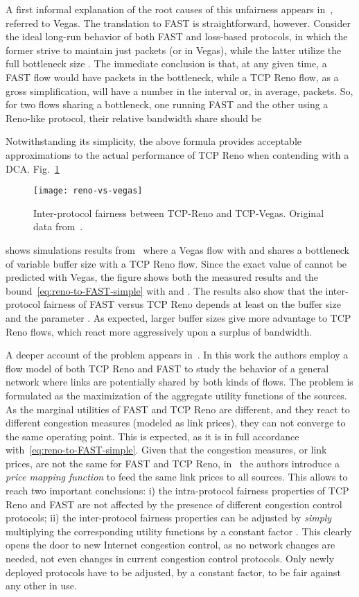 \documentclass[english,times]{ettauth}
\begin{document}
A first informal explanation of the root causes of this unfairness appears
in~\cite{Mo99}, referred to Vegas. The translation to FAST is straightforward,
however. Consider the ideal long-run behavior of both FAST and loss-based
protocols, in which the former strive to maintain just  packets
(or  in Vegas), while the latter utilize the full
bottleneck size . The immediate conclusion is that, at any given time, a
FAST flow would have  packets in the bottleneck, while a TCP Reno flow, as
a gross simplification, will have a number in the interval  or, in
average,  packets. So, for two flows sharing a bottleneck, one
running FAST and the other using a Reno-like protocol, their relative
bandwidth share should be


Notwithstanding its simplicity, the above formula provides acceptable
approximations to the actual performance of TCP Reno when contending with a
DCA. Fig.~\ref{fig:reno-vs-vegas-fairness}
\begin{figure}
  \centering
  \texttt{[image: reno-vs-vegas]}
  \caption{Inter-protocol fairness between TCP-Reno and TCP-Vegas. Original
    data from~\cite{Mo99}.}
  \label{fig:reno-vs-vegas-fairness}
\end{figure}
shows simulations results from~\cite{Mo99} where a Vegas flow with 
and  shares a bottleneck of variable buffer size with a TCP Reno
flow. Since the exact value of  cannot be predicted with Vegas, the figure
shows both the measured results and the bound~\eqref{eq:reno-to-FAST-simple}
with  and . The results also show that the
inter-protocol fairness of FAST versus TCP Reno depends at least on the buffer
size and the parameter . As expected, larger buffer sizes give more
advantage to TCP Reno flows, which react more aggressively upon a surplus of
bandwidth.

A deeper account of the problem appears in~\cite{Tang05}. In this work the
authors employ a flow model of both TCP Reno and FAST to study the behavior of
a general network where links are potentially shared by both kinds of flows.
The problem is formulated as the maximization of the aggregate utility
functions of the sources. As the marginal utilities of FAST and TCP Reno are
different, and they react to different congestion measures (modeled as link
prices), they can not converge to the same operating point. This is expected,
as it is in full accordance with~\eqref{eq:reno-to-FAST-simple}. Given that
the congestion measures, or link prices, are not the same for FAST and TCP
Reno, in~\cite{Tang05} the authors introduce a \emph{price mapping function}
to feed the same link prices to all sources. This allows to reach two
important conclusions: i) the intra-protocol fairness properties of TCP Reno
and FAST are not affected by the presence of different congestion control
protocols; ii) the inter-protocol fairness properties can be adjusted by
\emph{simply} multiplying the corresponding utility functions by a constant
factor  . This clearly opens the door to new Internet congestion control,
as no network changes are needed, not even changes in current congestion
control protocols. Only newly deployed protocols have to be adjusted, by a
constant factor, to be fair against any other in use.
\end{document}
